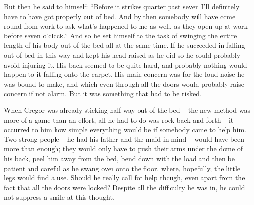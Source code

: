 But then he said to himself: “Before it strikes quarter past seven I’ll
definitely have to have got properly out of bed. And by then somebody
will have come round from work to ask what’s happened to me as well, as
they open up at work before seven o’clock.” And so he set himself to
the task of swinging the entire length of his body out of the bed all
at the same time. If he succeeded in falling out of bed in this way and
kept his head raised as he did so he could probably avoid injuring it.
His back seemed to be quite hard, and probably nothing would happen to
it falling onto the carpet. His main concern was for the loud noise he
was bound to make, and which even through all the doors would probably
raise concern if not alarm. But it was something that had to be risked.

When Gregor was already sticking half way out of the bed – the new method
was more of a game than an effort, all he had to do was rock back and
forth – it occurred to him how simple everything would be if somebody
came to help him. Two strong people – he had his father and the maid in
mind – would have been more than enough; they would only have to push
their arms under the dome of his back, peel him away from the bed, bend
down with the load and then be patient and careful as he swang over
onto the floor, where, hopefully, the little legs would find a use.
Should he really call for help though, even apart from the fact that
all the doors were locked? Despite all the difficulty he was in, he
could not suppress a smile at this thought.

